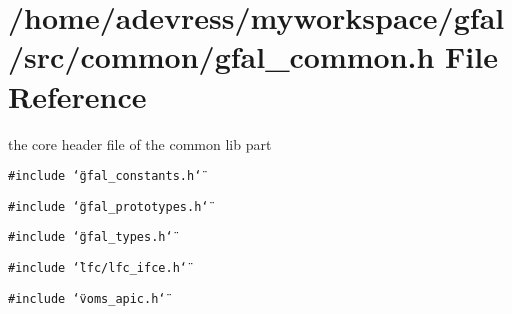 \section{/home/adevress/myworkspace/gfal/src/common/gfal\_\-common.h File Reference}
\label{gfal__common_8h}
the core header file of the common lib part 

{\tt \#include \char`\"{}gfal\_\-constants.h\char`\"{}}\par
{\tt \#include \char`\"{}gfal\_\-prototypes.h\char`\"{}}\par
{\tt \#include \char`\"{}gfal\_\-types.h\char`\"{}}\par
{\tt \#include \char`\"{}lfc/lfc\_\-ifce.h\char`\"{}}\par
{\tt \#include \char`\"{}voms\_\-apic.h\char`\"{}}\par
